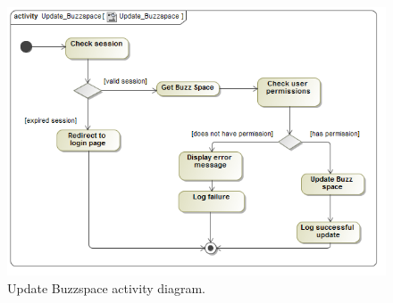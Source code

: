 \documentclass [a4paper,12pt] {article}
\begin{document}
			\begin{figure}[H]
				\centering
				\includegraphics[width=1.0\textwidth]{UpdateBuzzspaceAD.png}
				\caption{Update Buzzspace activity diagram.}
			\end{figure}
\end{document}
